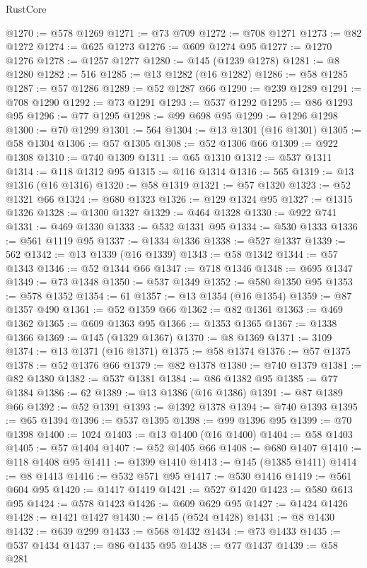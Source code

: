 \begin{lexlean}{RustCore}
\begin{coremodule}
@1270 := @578 @1269
@1271 := @73 @709
@1272 := @708 @1271
@1273 := @82 @1272
@1274 := @625 @1273
@1276 := @609 @1274 @95
@1277 := @1270 @1276
@1278 := @1257 @1277
@1280 := @145 (@1239 @1278)
@1281 := @8 @1280
@1282 := 516
@1285 := @13 @1282 (@16 @1282)
@1286 := @58 @1285
@1287 := @57 @1286
@1289 := @52 @1287 @66
@1290 := @239 @1289
@1291 := @708 @1290
@1292 := @73 @1291
@1293 := @537 @1292
@1295 := @86 @1293 @95
@1296 := @77 @1295
@1298 := @99 @698 @95
@1299 := @1296 @1298
@1300 := @70 @1299
@1301 := 564
@1304 := @13 @1301 (@16 @1301)
@1305 := @58 @1304
@1306 := @57 @1305
@1308 := @52 @1306 @66
@1309 := @922 @1308
@1310 := @740 @1309
@1311 := @65 @1310
@1312 := @537 @1311
@1314 := @118 @1312 @95
@1315 := @116 @1314
@1316 := 565
@1319 := @13 @1316 (@16 @1316)
@1320 := @58 @1319
@1321 := @57 @1320
@1323 := @52 @1321 @66
@1324 := @680 @1323
@1326 := @129 @1324 @95
@1327 := @1315 @1326
@1328 := @1300 @1327
@1329 := @464 @1328
@1330 := @922 @741
@1331 := @469 @1330
@1333 := @532 @1331 @95
@1334 := @530 @1333
@1336 := @561 @1119 @95
@1337 := @1334 @1336
@1338 := @527 @1337
@1339 := 562
@1342 := @13 @1339 (@16 @1339)
@1343 := @58 @1342
@1344 := @57 @1343
@1346 := @52 @1344 @66
@1347 := @718 @1346
@1348 := @695 @1347
@1349 := @73 @1348
@1350 := @537 @1349
@1352 := @580 @1350 @95
@1353 := @578 @1352
@1354 := 61
@1357 := @13 @1354 (@16 @1354)
@1359 := @87 @1357 @490
@1361 := @52 @1359 @66
@1362 := @82 @1361
@1363 := @469 @1362
@1365 := @609 @1363 @95
@1366 := @1353 @1365
@1367 := @1338 @1366
@1369 := @145 (@1329 @1367)
@1370 := @8 @1369
@1371 := 3109
@1374 := @13 @1371 (@16 @1371)
@1375 := @58 @1374
@1376 := @57 @1375
@1378 := @52 @1376 @66
@1379 := @82 @1378
@1380 := @740 @1379
@1381 := @82 @1380
@1382 := @537 @1381
@1384 := @86 @1382 @95
@1385 := @77 @1384
@1386 := 62
@1389 := @13 @1386 (@16 @1386)
@1391 := @87 @1389 @66
@1392 := @52 @1391
@1393 := @1392 @1378
@1394 := @740 @1393
@1395 := @65 @1394
@1396 := @537 @1395
@1398 := @99 @1396 @95
@1399 := @70 @1398
@1400 := 1024
@1403 := @13 @1400 (@16 @1400)
@1404 := @58 @1403
@1405 := @57 @1404
@1407 := @52 @1405 @66
@1408 := @680 @1407
@1410 := @118 @1408 @95
@1411 := @1399 @1410
@1413 := @145 (@1385 @1411)
@1414 := @8 @1413
@1416 := @532 @571 @95
@1417 := @530 @1416
@1419 := @561 @604 @95
@1420 := @1417 @1419
@1421 := @527 @1420
@1423 := @580 @613 @95
@1424 := @578 @1423
@1426 := @609 @629 @95
@1427 := @1424 @1426
@1428 := @1421 @1427
@1430 := @145 (@524 @1428)
@1431 := @8 @1430
@1432 := @639 @299
@1433 := @568 @1432
@1434 := @73 @1433
@1435 := @537 @1434
@1437 := @86 @1435 @95
@1438 := @77 @1437
@1439 := @58 @281

\end{coremodule}
\end{lexlean}
